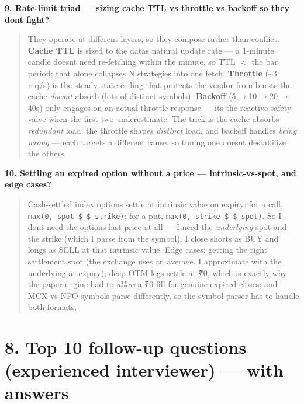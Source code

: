 \documentclass[11pt]{article}
\begin{document}
\textbf{9. Rate-limit triad --- sizing cache TTL vs throttle vs backoff so they don\textquotesingle t fight?}

\begin{quote}
They operate at different layers, so they compose rather than conflict. \textbf{Cache TTL} is sized to
the data\textquotesingle s natural update rate --- a 1-minute candle doesn\textquotesingle t need re-fetching within the minute, so
TTL \(\approx\) the bar period; that alone collapses N strategies into one fetch. \textbf{Throttle} (\textasciitilde3 req/s)
is the steady-state ceiling that protects the vendor from bursts the cache \emph{doesn\textquotesingle t} absorb (lots
of distinct symbols). \textbf{Backoff} (5\(\rightarrow\)10\(\rightarrow\)20\(\rightarrow\)40s) only engages on an actual throttle response --- it\textquotesingle s
the reactive safety valve when the first two underestimate. The trick is the cache absorbs
\emph{redundant} load, the throttle shapes \emph{distinct} load, and backoff handles \emph{being wrong} --- each
targets a different cause, so tuning one doesn\textquotesingle t destabilize the others.
\end{quote}

\textbf{10. Settling an expired option without a price --- intrinsic-vs-spot, and edge cases?}

\begin{quote}
Cash-settled index options settle at intrinsic value on expiry: for a call, \texttt{max(0,\ spot\ \$-\$\ strike)}; for a put, \texttt{max(0,\ strike\ \$-\$\ spot)}. So I don\textquotesingle t need the option\textquotesingle s last price at all --- I
need the \emph{underlying} spot and the strike (which I parse from the symbol). I close shorts as BUY
and longs as SELL at that intrinsic value. Edge cases: getting the right settlement spot (the
exchange uses an average, I approximate with the underlying at expiry); deep OTM legs settle at
₹0, which is exactly why the paper engine had to \emph{allow} a ₹0 fill for genuine expired closes;
and MCX vs NFO symbols parse differently, so the symbol parser has to handle both formats.
\end{quote}

\section{8. Top 10 follow-up questions (experienced interviewer) --- with answers}\label{8-top-10-follow-up-questions-experienced-interviewer--with-answers}
\end{document}
